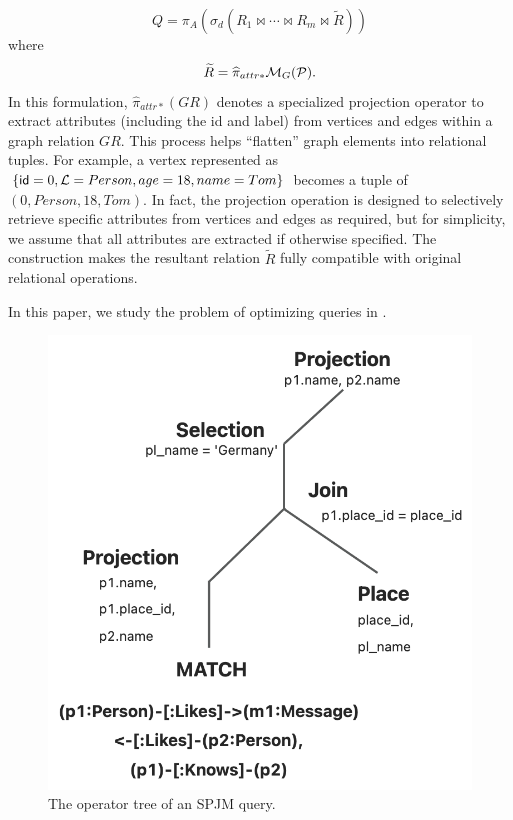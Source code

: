 \begin{equation}
    \label{eq:spjm}
Q = \pi_A(\sigma_d(R_1 \Join \cdots \Join R_m \Join \widetilde{R}))
\end{equation}
where
\[
\widetilde{R} = \widehat{\pi}_{attr*}\mathcal{M}_G(\mathcal{P}).
\]
In this formulation, \(\widehat{\pi}_{attr*}(GR)\) denotes a specialized projection operator to extract attributes (including the id and label)
from vertices and edges within a graph relation $GR$.
This process helps ``flatten'' graph elements into relational tuples.
For example, a vertex represented as \(\{{\mathsf{id}}=0, \mathcal{L}=Person, age=18, name=Tom\}\) becomes a tuple of \((0, Person, 18, Tom)\).
In fact, the projection operation is designed to selectively retrieve specific attributes from vertices and edges as required, but for simplicity, we assume that all attributes are extracted if otherwise specified.
The construction makes the resultant relation \(\tilde{R}\) fully compatible with original relational operations.

In this paper, we study the problem of optimizing \spjm queries in .


\begin{figure}
    \centering
    \includegraphics[width=.6\linewidth]{./figures/spjm.png}
    \caption{The operator tree of an SPJM query.}
    \label{fig:spjm}
\end{figure}


